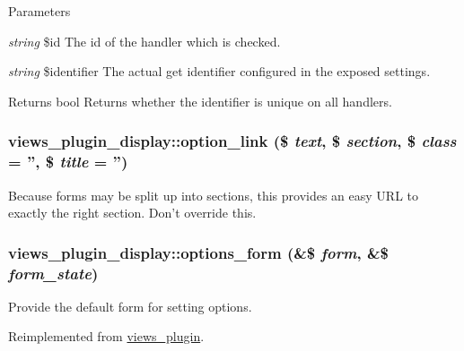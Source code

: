 \begin{DoxyParams}{Parameters}
\item[{\em string}]\$id The id of the handler which is checked. \item[{\em string}]\$identifier The actual get identifier configured in the exposed settings.\end{DoxyParams}
\begin{DoxyReturn}{Returns}
bool Returns whether the identifier is unique on all handlers. 
\end{DoxyReturn}
\hypertarget{classviews__plugin__display_a56c8b43b4f8605d40c23b7e573a185e0}{
\subsubsection[{option\_\-link}]{\setlength{\rightskip}{0pt plus 5cm}views\_\-plugin\_\-display::option\_\-link (\$ {\em text}, \/  \$ {\em section}, \/  \$ {\em class} = {\ttfamily ''}, \/  \$ {\em title} = {\ttfamily ''})}}
\label{classviews__plugin__display_a56c8b43b4f8605d40c23b7e573a185e0}
Because forms may be split up into sections, this provides an easy URL to exactly the right section. Don't override this. \hypertarget{classviews__plugin__display_ad9c69d91ea1165ff51dcd1f1f6d3a154}{
\subsubsection[{options\_\-form}]{\setlength{\rightskip}{0pt plus 5cm}views\_\-plugin\_\-display::options\_\-form (\&\$ {\em form}, \/  \&\$ {\em form\_\-state})}}
\label{classviews__plugin__display_ad9c69d91ea1165ff51dcd1f1f6d3a154}
Provide the default form for setting options. 

Reimplemented from \hyperlink{classviews__plugin_a1aaed8da1afd9f45293a37358c159837}{views\_\-plugin}.

